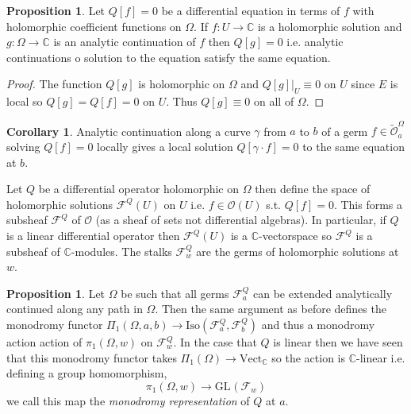 \documentclass[12pt]{extarticle}
\newcommand{\C}{\mathbb{C}}
\theoremstyle{definition}
\newtheorem{proposition}[theorem]{Proposition}
\newtheorem{corollary}[theorem]{Corollary}
\newenvironment{definition}[1][Definition:]{\begin{trivlist}
\item[\hskip \labelsep {\bfseries #1}]}{\end{trivlist}}
\newcommand{\F}{\mathcal{F}}
\renewcommand{\O}{\mathcal{O}}
\newcommand{\GL}[2]{\mathrm{GL}_{#1}\left( #2 \right)}
\begin{document}
\begin{proposition}
Let $Q[f] = 0$ be a differential equation in terms of $f$ with holomorphic coefficient functions on $\Omega$. If $f : U \to \C$ is a holomorphic solution and $g : \Omega \to \C$ is an analytic continuation of $f$ then $Q[g] = 0$ i.e. analytic continuations o solution to the equation satisfy the same equation.
\end{proposition}

\begin{proof}
The function $Q[g]$ is holomorphic on $\Omega$ and $Q[g]|_U \equiv 0$ on $U$ since $E$ is local so $Q[g] = Q[f] = 0$ on $U$. Thus $Q[g] \equiv 0$ on all of $\Omega$.
\end{proof}

\begin{corollary}
Analytic continuation along a curve $\gamma$ from $a$ to $b$ of a germ $f \in \tilde{\O}_a^\Omega$ solving $Q[f] = 0$ locally gives a local solution $Q[\gamma \cdot f] = 0$ to the same equation at $b$. 
\end{corollary}

\begin{definition}
Let $Q$ be a differential operator holomorphic on $\Omega$ then define the space of holomorphic solutions $\F^Q(U)$ on $U$ i.e. $f \in \O(U)$ s.t. $Q[f] = 0$. This forms a subsheaf $\F^Q$ of $\O$ (as a sheaf of sets not differential algebras). In particular, if $Q$ is a linear differential operator then $\F^Q(U)$ is a $\C$-vectorspace so $\F^Q$ is a subsheaf of $\C$-modules. The stalks $\F^Q_w$ are the germs of holomorphic solutions at $w$.  
\end{definition}

\begin{proposition}
Let $\Omega$ be such that all germs $\F^Q_a$ can be extended analytically continued along any path in $\Omega$. Then the same argument as before defines the monodromy functor $\Pi_1(\Omega, a, b) \to \text{Iso}(\F^Q_a, \F^Q_b)$ and thus a monodromy action
action of $\pi_1(\Omega, w)$ on $\F^Q_w$. In the case that $Q$ is linear then we have seen that this monodromy functor takes $\Pi_1(\Omega) \to \text{Vect}_\C$ so the action is $\C$-linear i.e. defining a group homomorphism,
\[ \pi_1(\Omega, w) \to \GL{}{\F_w} \]
we call this map the \textit{monodromy representation} of $Q$ at $a$. 
\end{proposition}
\end{document}

